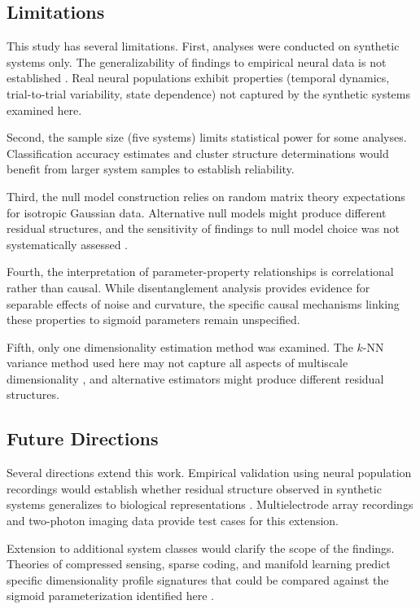 \subsection{Limitations}

This study has several limitations. First, analyses were conducted on synthetic systems only. The generalizability of findings to empirical neural data is not established \citep{gao2017emergence}. Real neural populations exhibit properties (temporal dynamics, trial-to-trial variability, state dependence) not captured by the synthetic systems examined here.

Second, the sample size (five systems) limits statistical power for some analyses. Classification accuracy estimates and cluster structure determinations would benefit from larger system samples to establish reliability.

Third, the null model construction relies on random matrix theory expectations for isotropic Gaussian data. Alternative null models might produce different residual structures, and the sensitivity of findings to null model choice was not systematically assessed \citep{marchenko1967distribution, couillet2011random}.

Fourth, the interpretation of parameter-property relationships is correlational rather than causal. While disentanglement analysis provides evidence for separable effects of noise and curvature, the specific causal mechanisms linking these properties to sigmoid parameters remain unspecified.

Fifth, only one dimensionality estimation method was examined. The $k$-NN variance method used here may not capture all aspects of multiscale dimensionality \citep{facco2017estimating}, and alternative estimators might produce different residual structures.

\subsection{Future Directions}

Several directions extend this work. Empirical validation using neural population recordings would establish whether residual structure observed in synthetic systems generalizes to biological representations \citep{stringer2019high}. Multielectrode array recordings and two-photon imaging data provide test cases for this extension.

Extension to additional system classes would clarify the scope of the findings. Theories of compressed sensing, sparse coding, and manifold learning predict specific dimensionality profile signatures that could be compared against the sigmoid parameterization identified here \citep{belkin2003laplacian, tenenbaum2000global}.

